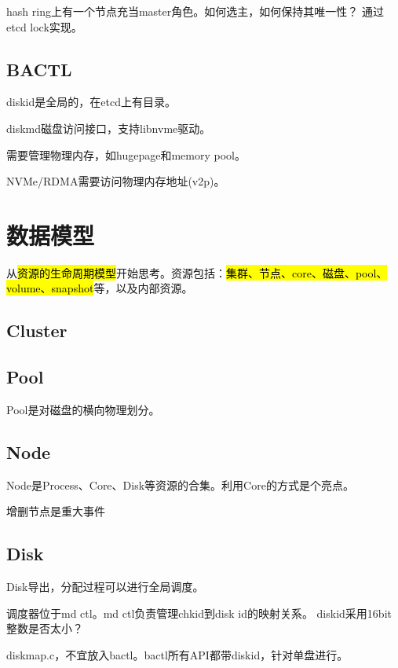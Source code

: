 hash ring上有一个节点充当master角色。如何选主，如何保持其唯一性？
通过etcd lock实现。

\subsection{BACTL}


diskid是全局的，在etcd上有目录。

diskmd磁盘访问接口，支持libnvme驱动。

需要管理物理内存，如hugepage和memory pool。

NVMe/RDMA需要访问物理内存地址(v2p)。

\section{数据模型}


从\hl{资源的生命周期模型}开始思考。资源包括：\hl{集群、节点、core、磁盘、pool、volume、snapshot}等，以及内部资源。

\subsection{Cluster}

\subsection{Pool}

Pool是对磁盘的横向物理划分。

\subsection{Node}

Node是Process、Core、Disk等资源的合集。利用Core的方式是个亮点。

增删节点是重大事件

\subsection{Disk}

Disk导出，分配过程可以进行全局调度。

调度器位于md ctl。md ctl负责管理chkid到disk id的映射关系。
diskid采用16bit整数是否太小？

diskmap.c，不宜放入bactl。bactl所有API都带diskid，针对单盘进行。

